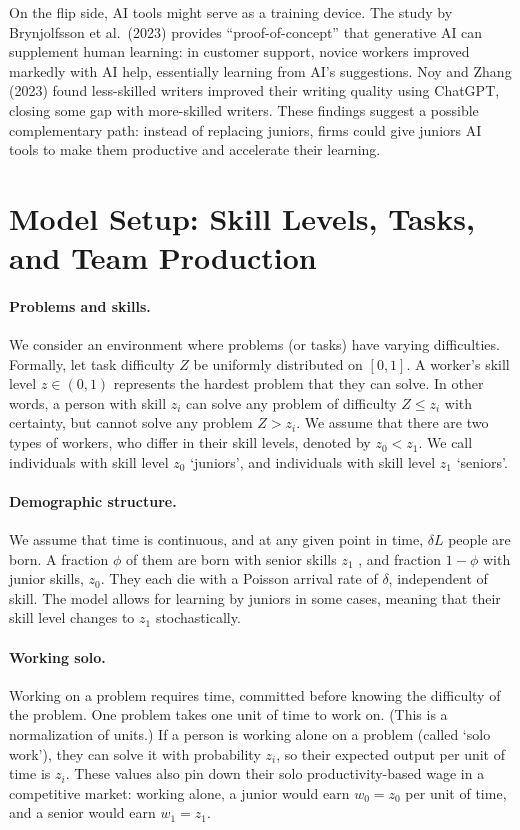 \documentclass[12pt]{article}
\begin{document}
On the flip side, AI tools might serve as a {training device}.
The study by Brynjolfsson et al.~(2023) provides
{``proof-of-concept'' that generative AI can supplement human
learning}: in customer support, novice workers improved markedly
with AI help, essentially learning from AI's suggestions. Noy and
Zhang (2023) found less-skilled writers improved their writing
quality using ChatGPT, closing some gap with more-skilled writers.
These findings suggest a possible {complementary} path: instead
of replacing juniors, firms could give juniors AI tools to make them
productive and accelerate their learning. 

\section{Model Setup: Skill Levels, Tasks, and Team Production}\label{model-setup-skill-levels-tasks-and-team-production}

\paragraph{Problems and skills.} We consider an environment where problems (or tasks) have varying difficulties. Formally, let task difficulty \(Z\) be uniformly distributed on \([0,1]\). A worker's skill level \(z\in(0,1)\) represents the hardest problem that they can solve. In other words, a person with skill \(z_i\) can solve any problem of difficulty \(Z \leq z_i\) with certainty, but cannot solve any problem $Z>z_i$. We assume that there are two types of workers, who differ in their skill levels, denoted by $z_0<z_1$. We call individuals with skill level $z_0$ `juniors', and individuals with skill level $z_1$ `seniors'.  

\paragraph{Demographic structure.} We assume that time is continuous, and at any given point in time, $\delta L$ people are born. A fraction $\phi$ of them are born with senior skills $z_1$ , and fraction $1-\phi$ with junior skills, $z_0$. They each die with a Poisson arrival rate of $\delta$, independent of skill. The model allows for learning by juniors in some cases, meaning that their skill level changes to $z_1$ stochastically. 

\paragraph{Working solo.} Working on a problem requires time, committed before knowing the difficulty of the problem. One problem takes one unit of time to work on. (This is a normalization of units.) If a person is working alone on a problem (called `solo work'), they can solve it with probability $z_i$, so their expected output per unit of time is $z_i$. These values also pin down their solo productivity-based wage in a competitive market: working alone, a junior would earn \(w_0 = z_0\) per unit of time, and a senior would earn \(w_1 = z_1\).
\end{document}

